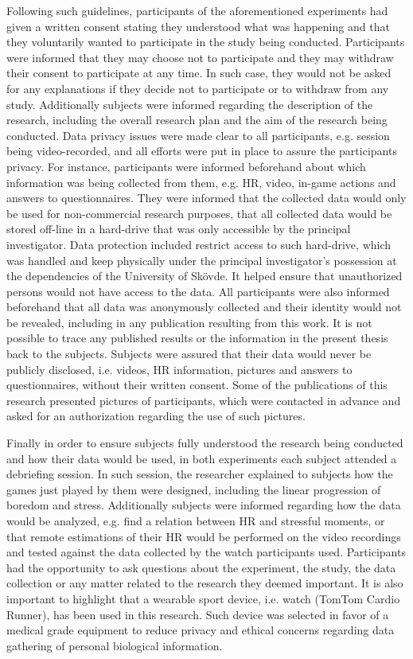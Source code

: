 Following such guidelines, participants of the aforementioned experiments had given a written consent stating they understood what was happening and that they voluntarily wanted to participate in the study being conducted. Participants were informed that they may choose not to participate and they may withdraw their consent to participate at any time. In such case, they would not be asked for any explanations if they decide not to participate or to withdraw from any study. Additionally subjects were informed regarding the description of the research, including the overall research plan and the aim of the research being conducted. Data privacy issues were made clear to all participants, e.g. session being video-recorded, and all efforts were put in place to assure the participants privacy. For instance, participants were informed beforehand about which information was being collected from them, e.g. HR, video, in-game actions and answers to questionnaires. They were informed that the collected data would only be used for non-commercial research purposes, that all collected data would be stored off-line in a hard-drive that was only accessible by the principal investigator. Data protection included restrict access to such hard-drive, which was handled and keep physically under the principal investigator's possession at the dependencies of the University of Sk\"ovde. It helped ensure that unauthorized persons would not have access to the data. All participants were also informed beforehand that all data was anonymously collected and their identity would not be revealed, including in any publication resulting from this work. It is not possible to trace any published results or the information in the present thesis back to the subjects. Subjects were assured that their data would never be publicly disclosed, i.e. videos, HR information, pictures and answers to questionnaires, without their written consent. Some of the publications of this research presented pictures of participants, which were contacted in advance and asked for an authorization regarding the use of such pictures.

Finally in order to ensure subjects fully understood the research being conducted and how their data would be used, in both experiments each subject attended a debriefing session. In such session, the researcher explained to subjects how the games just played by them were designed, including the linear progression of boredom and stress. Additionally subjects were informed regarding how the data would be analyzed, e.g. find a relation between HR and stressful moments, or that remote estimations of their HR would be performed on the video recordings and tested against the data collected by the watch participants used. Participants had the opportunity to ask questions about the experiment, the study, the data collection or any matter related to the research they deemed important. It is also important to highlight that a wearable sport device, i.e. watch (TomTom Cardio Runner), has been used in this research. Such device was selected in favor of a medical grade equipment to reduce privacy and ethical concerns regarding data gathering of personal biological information.

